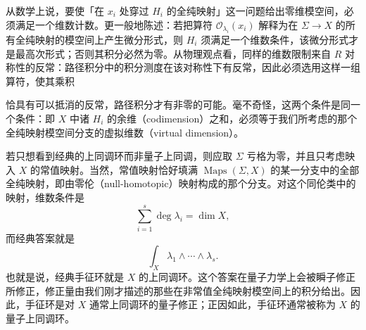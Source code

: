 
从数学上说，要使「在 $x_i$ 处穿过 $H_i$ 的全纯映射」这一问题给出零维模空间，必须满足一个维数计数。更一般地陈述：若把算符 $\mathcal{O}_{\lambda_i}(x_i)$ 解释为在 $\Sigma\to X$ 的所有全纯映射的模空间上产生微分形式，则 $H_i$ 须满足一个维数条件，该微分形式才是最高次形式；否则其积分必然为零。从物理观点看，同样的维数限制来自 $R$ 对称性的反常：路径积分中的积分测度在该对称性下有反常，因此必须选用这样一组算符，使其乘积


恰具有可以抵消的反常，路径积分才有非零的可能。毫不奇怪，这两个条件是同一个条件：即 $X$ 中诸 $H_i$ 的余维（codimension）之和，必须等于我们所考虑的那个全纯映射模空间分支的虚拟维数（virtual dimension）。

若只想看到经典的上同调环而非量子上同调，则应取 $\Sigma$ 亏格为零，并且只考虑映入 $X$ 的常值映射。当然，常值映射恰好填满 $\operatorname{Maps}(\Sigma,X)$ 的某一分支中的全部全纯映射，即由零伦（null-homotopic）映射构成的那个分支。对这个同伦类中的映射，维数条件是
\[
  \sum_{i=1}^{s}\deg\lambda_i=\dim X,
\]
而经典答案就是
\[
  \int_X\lambda_1\wedge\cdots\wedge\lambda_s.
\]
也就是说，经典手征环就是 $X$ 的上同调环。这个答案在量子力学上会被瞬子修正所修正，修正量由我们刚才描述的那些在非常值全纯映射模空间上的积分给出。因此，手征环是对 $X$ 通常上同调环的量子修正；正因如此，手征环通常被称为 $X$ 的量子上同调环。



